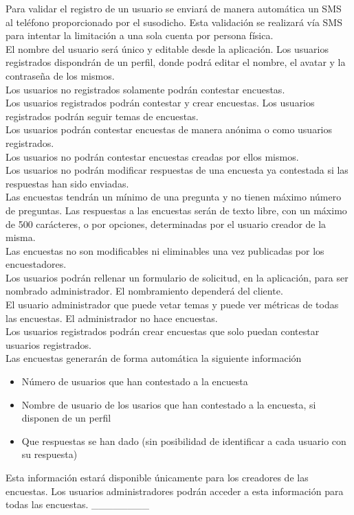 \documentclass[a4paper,11pt]{report}
\begin{document}
	Para validar el registro de un usuario se enviará de manera automática un SMS al teléfono proporcionado por el susodicho. Esta validación se realizará vía SMS para intentar la limitación a una sola cuenta por persona física.
	\\
	El nombre del usuario será único y editable desde la aplicación. Los usuarios registrados dispondrán de un perfil, donde podrá editar el nombre, el avatar y la contraseña de los mismos. 
	\\
	Los usuarios no registrados solamente podrán contestar encuestas. 
	\\
	Los usuarios registrados podrán contestar y crear encuestas. Los usuarios registrados podrán seguir temas de encuestas.
	\\
	Los usuarios podrán contestar encuestas de manera anónima o como usuarios registrados.
	\\
	Los usuarios no podrán contestar encuestas creadas por ellos mismos.
	\\
	Los usuarios no podrán modificar respuestas de una encuesta ya contestada si las respuestas han sido enviadas.
	\\
	Las encuestas tendrán un mínimo de una pregunta y no tienen máximo número de preguntas. Las respuestas a las encuestas serán de texto libre, con un máximo de 500 carácteres, o por opciones, determinadas por el usuario creador de la misma.
	\\
	Las encuestas no son modificables ni eliminables una vez publicadas por los encuestadores.
	\\
	Los usuarios podrán rellenar un formulario de solicitud, en la aplicación, para ser nombrado administrador. El nombramiento dependerá del cliente.
	\\
	El usuario administrador que puede vetar temas y puede ver métricas de todas las encuestas. El administrador no hace encuestas.
	\\
	Los usuarios registrados podrán crear encuestas que solo puedan contestar usuarios registrados.
	\\
	Las encuestas generarán de forma automática la siguiente información
	\begin{itemize}
		\item Número de usuarios que han contestado a la encuesta
		\item Nombre de usuario de los usarios que han contestado a la encuesta, si disponen de un perfil
		\item Que respuestas se han dado (sin posibilidad de identificar a cada usuario con su respuesta)
	\end{itemize}
	Esta información estará disponible únicamente para los creadores de las encuestas. Los usuarios administradores podrán acceder a esta información para todas las encuestas.
	\_\_\_\_\_\_\_\_
	
\end{document}
